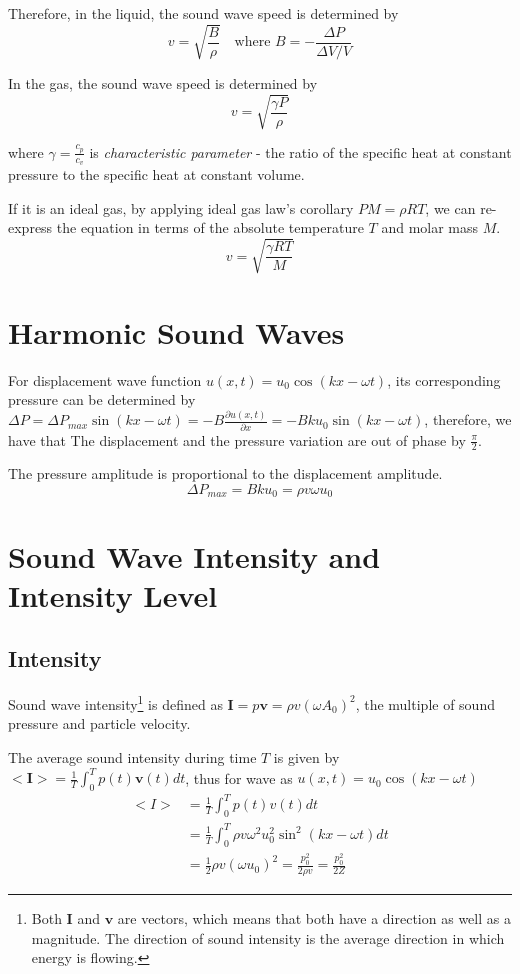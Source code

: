 \documentclass[openany]{book}
\begin{document}
Therefore, in the liquid, the sound wave speed is determined by
\[v=\sqrt{\frac{B}{\rho }}\quad \text{where }B=-\frac{\Delta P}{\Delta V/V}\]

In the gas, the sound wave speed is determined by
\[v=\sqrt{\frac{\gamma P}{\rho}}\]

where $\gamma =\frac{c_p}{c_v}$ is \emph{characteristic parameter} - the ratio of the specific heat at constant pressure to the specific heat at constant volume. 

If it is an ideal gas, by applying ideal gas law's corollary $PM=\rho RT$, we can re-express the equation in terms of the absolute temperature $T$ and molar mass $M$.
\[v=\sqrt{\frac{\gamma RT}{M}}\]
\section{Harmonic Sound Waves}
For displacement wave function $u(x,t)=u_0\cos (kx-\omega t)$, its corresponding pressure can be determined by $\Delta P=\Delta P_{max}\sin (kx-\omega t)=-B\frac{\partial u(x,t)}{\partial x}=-Bku_0\sin (kx-\omega t)$, therefore, we have that The displacement and the pressure variation are out of phase by $\frac{\pi }{2}$.

The pressure amplitude is proportional to the displacement amplitude.
\[\Delta P_{max}=Bku_0=\rho v\omega u_0\]
\section{Sound Wave Intensity and Intensity Level}
\subsection{Intensity}
Sound wave intensity\footnote{Both $\mathbf{I}$ and $\mathbf{v}$ are vectors, which means that both have a direction as well as a magnitude. The direction of sound intensity is the average direction in which energy is flowing.} is defined as $\mathbf{I}=p\mathbf{v}=\rho v(\omega A_0)^2$, the multiple of sound pressure and particle velocity. 

The average sound intensity during time $T$ is given by $<\mathbf{I}>=\frac{1}{T}\int _{0}^{T}p(t)\mathbf{v}(t)dt$, thus for wave as $u(x,t)=u_0\cos (kx-\omega t)$
\begin{align*}
<I>&=\frac{1}{T}\int _{0}^{T}p(t)v(t)dt\\
&=\frac{1}{T}\int _{0}^{T}\rho v\omega ^2u_0^2\sin ^2(kx-\omega t)dt\\
&=\frac{1}{2}\rho v(\omega u_0)^2=\frac{p_0^2}{2\rho v}=\frac{p_0^2}{2Z}
\end{align*}
\end{document}
